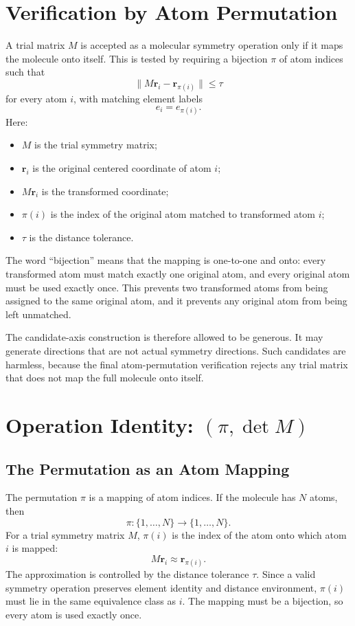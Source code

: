 \documentclass[11pt]{article}
\begin{document}
\section{Verification by Atom Permutation}

A trial matrix \(M\) is accepted as a molecular symmetry operation only if it
maps the molecule onto itself.  This is tested by requiring a bijection
\(\pi\) of atom indices such that
\[
    \lVert M\mathbf r_i-\mathbf r_{\pi(i)}\rVert \le \tau
\]
for every atom \(i\), with matching element labels
\[
    e_i = e_{\pi(i)}.
\]
Here:
\begin{itemize}
    \item \(M\) is the trial symmetry matrix;
    \item \(\mathbf r_i\) is the original centered coordinate of atom \(i\);
    \item \(M\mathbf r_i\) is the transformed coordinate;
    \item \(\pi(i)\) is the index of the original atom matched to transformed
    atom \(i\);
    \item \(\tau\) is the distance tolerance.
\end{itemize}

The word ``bijection'' means that the mapping is one-to-one and onto: every
transformed atom must match exactly one original atom, and every original atom
must be used exactly once.  This prevents two transformed atoms from being
assigned to the same original atom, and it prevents any original atom from being
left unmatched.

The candidate-axis construction is therefore allowed to be generous.  It may
generate directions that are not actual symmetry directions.  Such candidates
are harmless, because the final atom-permutation verification rejects any trial
matrix that does not map the full molecule onto itself.

\section{Operation Identity: \((\pi,\det M)\)}

\subsection{The Permutation as an Atom Mapping}

The permutation \(\pi\) is a mapping of atom indices.  If the molecule has
\(N\) atoms, then
\[
    \pi:\{1,\dots,N\}\rightarrow\{1,\dots,N\}.
\]
For a trial symmetry matrix \(M\), \(\pi(i)\) is the index of the atom onto
which atom \(i\) is mapped:
\[
    M\mathbf r_i \approx \mathbf r_{\pi(i)}.
\]
The approximation is controlled by the distance tolerance \(\tau\).  Since a
valid symmetry operation preserves element identity and distance environment,
\(\pi(i)\) must lie in the same equivalence class as \(i\).  The mapping must be
a bijection, so every atom is used exactly once.
\end{document}
